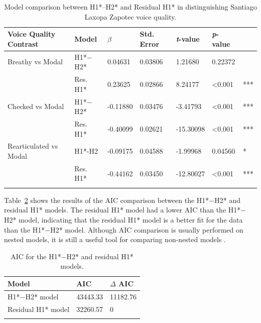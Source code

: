 \begin{table}[!h]
  \centering
  \caption{Model comparison between H1*$–$H2* and Residual H1* in distinguishing Santiago Laxopa Zapotec voice quality.}
  \label{tab:CGComparison}
    \begin{tabular}{lllllll}
      \lsptoprule
    Voice Quality Contrast & Model & \textit{$\beta$ } & Std. Error & \textit{t}-value & \textit{p}-value  &     \\
    \hline
      Breathy vs Modal &  H1*$-$H2* & 0.04631 & 0.03806  & 1.21680 & 0.22372 & \\
      & Res. H1* & 0.23625 & 0.02866 & 8.24177   & \textless 0.001   & *** \\
      Checked vs Modal & H1*$-$H2* & -0.11880 & 0.03476 & -3.41793  & \textless 0.001 & *** \\
      & Res. H1* & -0.40099 & 0.02621 & -15.30098 & \textless 0.001 & *** \\
      Rearticulated vs Modal & H1*-H2 & -0.09175 & 0.04588 & -1.99968 & 0.04560 & *  \\
     & Res. H1* & -0.44162 & 0.03450 & -12.80027 & \textless 0.001 & *** \\
     \lspbottomrule
    \end{tabular}
\end{table}

Table~\ref{tab:Comparison} shows the results of the AIC comparison between the H1*$-$H2* and residual H1* models. The residual H1* model had a lower AIC than the H1*$-$H2* model, indicating that the residual H1* model is a better fit for the data than the H1*$-$H2* model. Although AIC comparison is usually performed on nested models, it is still a useful tool for comparing non-nested models \citep{burnhamMultimodelInferenceUnderstanding2004,burnhamAICModelSelection2011,burnhamModelSelectionMultimodel2004}.

\begin{table}[!h]
  \centering
  \caption{AIC for the H1*$-$H2* and residual H1* models.}
  \label{tab:Comparison}
  \begin{tabular}{lll}
    \lsptoprule
    Model  & AIC & $\Delta$ AIC\\
    \hline
    H1*$-$H2* model & 43443.33 & 11182.76 \\
    Residual H1* model & 32260.57 & 0 \\
    \lspbottomrule
  \end{tabular}
\end{table}

